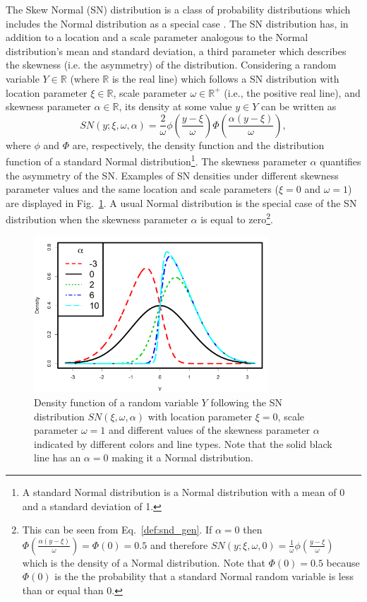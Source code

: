 \documentclass{aa}
\begin{document}
The Skew Normal (SN) distribution is a class of probability distributions which includes the Normal distribution as a special case \citep{Azzalini1985}. The SN distribution has, in addition to a location and a scale parameter analogous to the Normal distribution's mean and standard deviation, a third parameter which describes the skewness (i.e. the asymmetry) of the distribution. Considering a random variable $Y\in \mathbb R$ (where $\mathbb R$ is the real line) which follows a SN distribution with location parameter $\xi \in \mathbb R$, scale parameter $\omega \in \mathbb R^{+}$ (i.e., the positive real line), and skewness parameter $\alpha \in \mathbb R$, its density at some value $y\in Y$ can be written as 
\begin{equation} \label{def:snd_gen}
SN(y;\xi, \omega, \alpha) = \frac{2}{\omega} \phi\left(\frac{y-\xi}{\omega}\right) \Phi\left(\frac{\alpha(y-\xi)}{\omega}\right),
\end{equation}
where $\phi$ and $\Phi$ are, respectively, the density function and the distribution function of a standard Normal distribution\footnote{A standard Normal distribution is a Normal distribution with a mean of 0 and a standard deviation of 1.}.
The skewness parameter $\alpha$ quantifies the asymmetry of the SN. 
Examples of SN densities under different skewness parameter values and the same location and scale parameters ($\xi = 0$ and $\omega = 1$) are displayed in Fig.~\ref{fig:SN.plot}.  A usual Normal distribution is the special case of the SN distribution when the skewness parameter $\alpha$ is equal to zero\footnote{This can be seen from Eq.~\eqref{def:snd_gen}. If $\alpha = 0$ then $\Phi\left(\frac{\alpha(y-\xi)}{\omega}\right) = \Phi(0) = 0.5$ and therefore $SN(y;\xi, \omega, 0) = \frac{1}{\omega} \phi\left(\frac{y-\xi}{\omega}\right)$ which is the density of a Normal distribution. Note that $\Phi(0) = 0.5$ because $\Phi(0)$ is the the probability that a standard Normal random variable is less than or equal than 0.}.
%
\begin{figure}[t]
\begin{center}
\includegraphics[height = 2.3in]{Skew_Normal_densities_jjck.pdf} 
   \caption{Density function of a random variable $Y$ following the SN distribution $SN(\xi, \omega, \alpha)$ with location parameter $\xi = 0$, scale parameter $\omega = 1$ and different values of the skewness parameter $\alpha$ indicated by different colors and line types. Note that the solid black line has an $\alpha = 0$ making it a Normal distribution.}
   \label{fig:SN.plot}
\end{center}
\end{figure}
\end{document}
